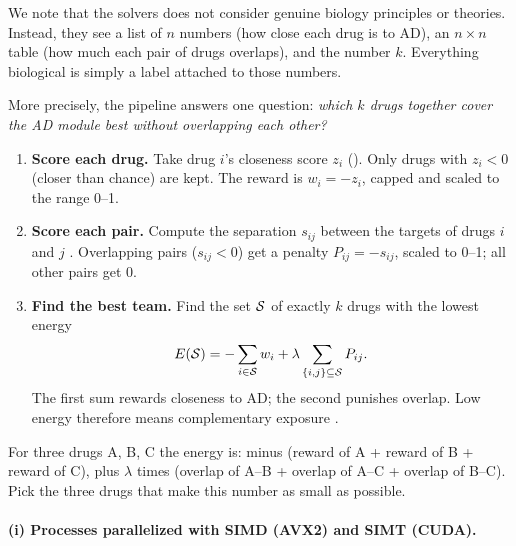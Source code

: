 We note that the solvers does not consider genuine biology principles or theories. Instead, they see a list of $n$ numbers (how close each drug is to AD), an $n\times n$ table (how much each pair of drugs overlaps), and the number $k$. Everything biological is simply a label attached to those numbers.

More precisely, the pipeline answers one question: \emph{which $k$ drugs together cover the AD module best without overlapping each other?}

\begin{enumerate}
\item \textbf{Score each drug.} Take drug $i$'s closeness score $z_i$ (). Only drugs with $z_i<0$ (closer than chance) are kept. The reward is $w_i=-z_i$, capped and scaled to the range 0--1.
\item \textbf{Score each pair.} Compute the separation $s_{ij}$ between the targets of drugs $i$ and $j$ \cite{menche2015uncovering}. Overlapping pairs ($s_{ij}<0$) get a penalty $P_{ij}=-s_{ij}$, scaled to 0--1; all other pairs get 0.
\item \textbf{Find the best team.} Find the set $\mathcal{S}$ of exactly $k$ drugs with the lowest energy
\begin{equation}
E(\mathcal{S}) = -\sum_{i\in\mathcal{S}} w_i + \lambda\sum_{\{i,j\}\subseteq\mathcal{S}} P_{ij}.
\label{eq:objective}
\end{equation}
The first sum rewards closeness to AD; the second punishes overlap. Low energy therefore means complementary exposure \cite{cheng2019combinations}.
\end{enumerate}


For three drugs A, B, C the energy is: minus (reward of A + reward of B + reward of C), plus $\lambda$ times (overlap of A--B + overlap of A--C + overlap of B--C). Pick the three drugs that make this number as small as possible.


\paragraph{(i) Processes parallelized with SIMD (AVX2) and SIMT (CUDA).}

